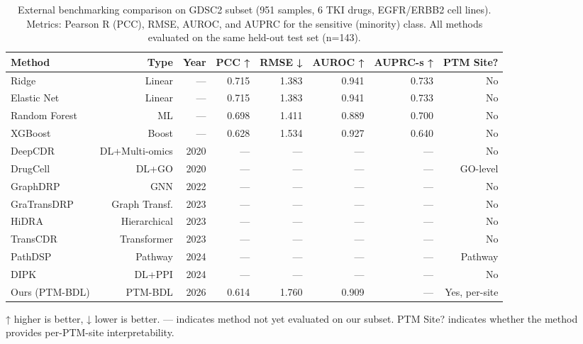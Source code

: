 \begin{table}[htbp]
\centering
\caption{External benchmarking comparison on GDSC2 subset (951 samples, 6 TKI drugs, EGFR/ERBB2 cell lines). Metrics: Pearson R (PCC), RMSE, AUROC, and AUPRC for the sensitive (minority) class. All methods evaluated on the same held-out test set (n=143).}
\label{tab:benchmarking}
\small
\begin{tabular}{lrrrrrrr}
\toprule
\textbf{Method} & \textbf{Type} & \textbf{Year} & \textbf{PCC ↑} & \textbf{RMSE ↓} & \textbf{AUROC ↑} & \textbf{AUPRC-s ↑} & \textbf{PTM Site?} \\
\midrule
Ridge & Linear & — & 0.715 & 1.383 & 0.941 & 0.733 & No \\
Elastic Net & Linear & — & 0.715 & 1.383 & 0.941 & 0.733 & No \\
Random Forest & ML & — & 0.698 & 1.411 & 0.889 & 0.700 & No \\
XGBoost & Boost & — & 0.628 & 1.534 & 0.927 & 0.640 & No \\
DeepCDR & DL+Multi-omics & 2020 & — & — & — & — & No \\
DrugCell & DL+GO & 2020 & — & — & — & — & GO-level \\
GraphDRP & GNN & 2022 & — & — & — & — & No \\
GraTransDRP & Graph Transf. & 2023 & — & — & — & — & No \\
HiDRA & Hierarchical & 2023 & — & — & — & — & No \\
TransCDR & Transformer & 2023 & — & — & — & — & No \\
PathDSP & Pathway & 2024 & — & — & — & — & Pathway \\
DIPK & DL+PPI & 2024 & — & — & — & — & No \\
Ours (PTM-BDL) & PTM-BDL & 2026 & 0.614 & 1.760 & 0.909 & — & Yes, per-site \\
\bottomrule
\end{tabular}
\vspace{2pt}
\begin{minipage}{\textwidth}
\footnotesize ↑ higher is better, ↓ lower is better. — indicates method not yet evaluated on our subset. PTM Site? indicates whether the method provides per-PTM-site interpretability.
\end{minipage}
\end{table}